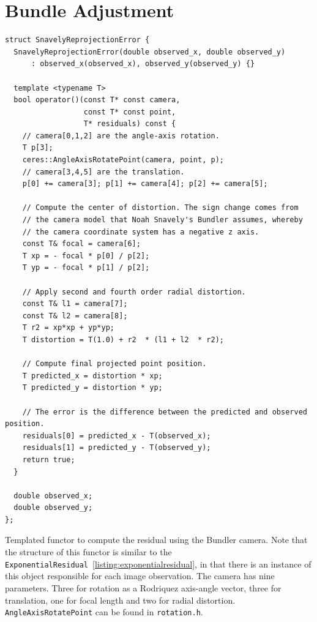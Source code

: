 \section{Bundle Adjustment}
\label{sec:tutorial:bundleadjustment}
\begin{listing}[ht]
\begin{verbatim}
struct SnavelyReprojectionError {
  SnavelyReprojectionError(double observed_x, double observed_y)
      : observed_x(observed_x), observed_y(observed_y) {}

  template <typename T>
  bool operator()(const T* const camera,
                  const T* const point,
                  T* residuals) const {
    // camera[0,1,2] are the angle-axis rotation.
    T p[3];
    ceres::AngleAxisRotatePoint(camera, point, p);
    // camera[3,4,5] are the translation.
    p[0] += camera[3]; p[1] += camera[4]; p[2] += camera[5];

    // Compute the center of distortion. The sign change comes from
    // the camera model that Noah Snavely's Bundler assumes, whereby
    // the camera coordinate system has a negative z axis.
    const T& focal = camera[6];
    T xp = - focal * p[0] / p[2];
    T yp = - focal * p[1] / p[2];

    // Apply second and fourth order radial distortion.
    const T& l1 = camera[7];
    const T& l2 = camera[8];
    T r2 = xp*xp + yp*yp;
    T distortion = T(1.0) + r2  * (l1 + l2  * r2);

    // Compute final projected point position.
    T predicted_x = distortion * xp;
    T predicted_y = distortion * yp;

    // The error is the difference between the predicted and observed position.
    residuals[0] = predicted_x - T(observed_x);
    residuals[1] = predicted_y - T(observed_y);
    return true;
  }

  double observed_x;
  double observed_y;
};
\end{verbatim}
\caption{Templated functor to compute the residual using the Bundler camera. Note that the structure of this functor is similar to the \texttt{ExponentialResidual}~\ref{listing:exponentialresidual}, in that there is an instance of this object responsible for each image observation. The camera has nine parameters. Three for rotation as a Rodriquez axis-angle vector, three for translation, one for focal length and two for radial distortion. \texttt{AngleAxisRotatePoint} can be found in \texttt{rotation.h}.}
\label{listing:bundlerresidual}
\end{listing}

